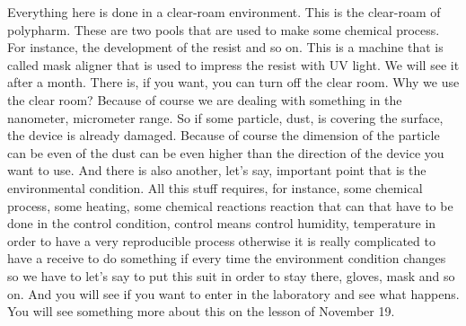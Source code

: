 Everything here is done in a clear-roam environment. This is the clear-roam of polypharm. These are two pools that are used to make some chemical process. For instance, the development of the resist and so on. This is a machine that is called mask aligner that is used to impress the resist with UV light. We will see it after a month. There is, if you want, you can turn off the clear room. Why we use the clear room? Because of course we are dealing with something in the nanometer, micrometer range. So if some particle, dust, is covering the surface, the device is already damaged. Because of course the dimension of the particle can be even of the dust can be even higher than the direction of the device you want to use. And there is also another, let's say, important point that is the environmental condition. All this stuff requires, for instance, some chemical process, some heating, some chemical reactions reaction that can that have to be done in the control condition, control means control humidity, temperature in order to have a very reproducible process otherwise it is really complicated to have a receive to do something if every time the environment condition changes so we have to let's say to put this suit in order to stay there, gloves, mask and so on. And you will see if you want to enter in the laboratory and see what happens. You will see something more about this on the lesson of November 19.
